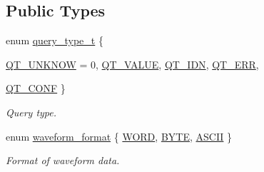\subsection*{Public Types}
\begin{DoxyCompactItemize}
\item 
enum \hyperlink{classmdt_frame_codec_scpi_a2dbce7589140e915f3e253c3523b3b9a}{query\_\-type\_\-t} \{ \par
\hyperlink{classmdt_frame_codec_scpi_a2dbce7589140e915f3e253c3523b3b9aa80aaf6e25ad52710c5f61c6d734a0897}{QT\_\-UNKNOW} =  0, 
\hyperlink{classmdt_frame_codec_scpi_a2dbce7589140e915f3e253c3523b3b9aae429676cb0129c2cb9179baf00d7e082}{QT\_\-VALUE}, 
\hyperlink{classmdt_frame_codec_scpi_a2dbce7589140e915f3e253c3523b3b9aa889641e5713b59c1d91a9cc607745bc9}{QT\_\-IDN}, 
\hyperlink{classmdt_frame_codec_scpi_a2dbce7589140e915f3e253c3523b3b9aa6e1b9ed9dff72df39e3b3fc88611e4a5}{QT\_\-ERR}, 
\par
\hyperlink{classmdt_frame_codec_scpi_a2dbce7589140e915f3e253c3523b3b9aa3df0e44b2eeacfad6f93ac9201db101d}{QT\_\-CONF}
 \}
\begin{DoxyCompactList}\small\item\em Query type. \end{DoxyCompactList}\item 
enum \hyperlink{classmdt_frame_codec_scpi_a1aafb008a4207cc922f46fe905b3f17d}{waveform\_\-format} \{ \hyperlink{classmdt_frame_codec_scpi_a1aafb008a4207cc922f46fe905b3f17da7f4b47afe74504dea43bb04c8c6fbe58}{WORD}, 
\hyperlink{classmdt_frame_codec_scpi_a1aafb008a4207cc922f46fe905b3f17daad91226f87cea7fab38f5cc7618f424c}{BYTE}, 
\hyperlink{classmdt_frame_codec_scpi_a1aafb008a4207cc922f46fe905b3f17da957445cd510a5c4e6964e9b79e73af4d}{ASCII}
 \}
\begin{DoxyCompactList}\small\item\em Format of waveform data. \end{DoxyCompactList}\end{DoxyCompactItemize}
